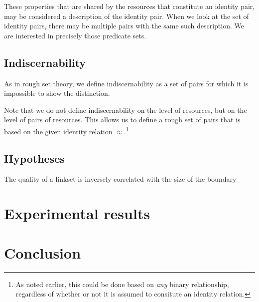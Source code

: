 \documentclass[11pt,a4paper,notitlepage,onecolumn,twoside]{article}
\begin{document}
These properties that are shared by the resources that constitute an identity pair, may be considered a description of the identity pair. When we look at the set of identity pairs, there may be multiple pairs with the same such description. We are interested in precisely those predicate sets.

\subsection{Indiscernability}

As in rough set theory, we define indiscernability as a set of pairs for which it is impossible to show the distinction.

Note that we do not define indiscernability on the level of resources, but on the level of pairs of resources. This allows us to define a rough set of pairs that is based on the given identity relation $\approx$.\footnote{As noted earlier, this could be done based on \emph{any} binary relationship, regardless of whether or not it is assumed to consitute an identity relation.}



\subsection{Hypotheses}

The quality of a linkset is inversely correlated with the size of the boundary

\section{Experimental results}

\section{Conclusion}
\end{document}
